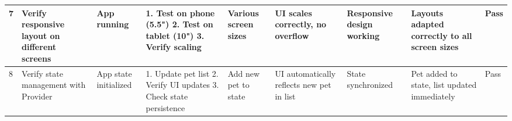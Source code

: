 \begin{table}[H]
\begin{tabular}{|p{0.4cm}|p{2cm}|p{1.2cm}|p{2cm}|p{2cm}|p{2cm}|p{1.5cm}|p{2cm}|p{0.7cm}|}
7 & Verify responsive layout on different screens & App running & 1. Test on phone (5.5") 2. Test on tablet (10") 3. Verify scaling & Various screen sizes & UI scales correctly, no overflow & Responsive design working & Layouts adapted correctly to all screen sizes & Pass \\ \hline
8 & Verify state management with Provider & App state initialized & 1. Update pet list 2. Verify UI updates 3. Check state persistence & Add new pet to state & UI automatically reflects new pet in list & State synchronized & Pet added to state, list updated immediately & Pass \\ \hline
\end{tabular}
\label{tab:ui_tests}
\end{table}
